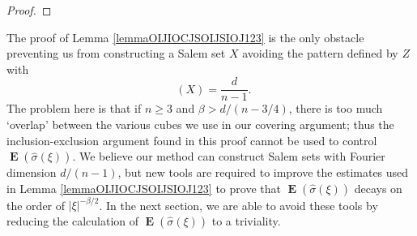 \documentclass[dvipsnames,letterpaper,12pt]{article}
\numberwithin{equation}{section}
\DeclareMathOperator{\fordim}{\dim_{\mathbf{F}}}
\DeclareMathOperator{\ZZ}{\mathbf{Z}}
\DeclareMathOperator{\TT}{\mathbf{T}}
\numberwithin{theorem}{section}
\DeclareMathOperator{\EE}{\mathbf{E}}
\begin{document}
\begin{proof}
\end{proof}

The proof of Lemma \ref{lemmaOIJIOCJSOIJSIOJ123} is the only obstacle preventing us from constructing a Salem set $X$ avoiding the pattern defined by $Z$ with
%
\[ \fordim(X) = \frac{d}{n-1}. \]
%
The problem here is that if $n \geq 3$ and $\beta > d/(n-3/4)$, there is too much `overlap' between the various cubes we use in our covering argument; thus the inclusion-exclusion argument found in this proof cannot be used to control $\EE(\widehat{\sigma}(\xi))$. We believe our method can construct Salem sets with Fourier dimension $d/(n-1)$, but new tools are required to improve the estimates used in Lemma \ref{lemmaOIJIOCJSOIJSIOJ123} to prove that $\EE(\widehat{\sigma}(\xi))$ decays on the order of $|\xi|^{-\beta/2}$. In the next section, we are able to avoid these tools by reducing the calculation of $\EE(\widehat{\sigma}(\xi))$ to a triviality.
\end{document}
